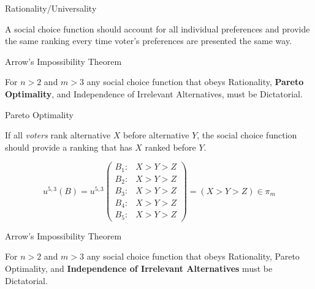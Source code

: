 \documentclass{beamer}
\begin{document}
\begin{frame}{Rationality/Universality}
    \begin{definition}[Rationality]
       A social choice function should account for all individual preferences and provide the same ranking every time voter's preferences are presented the same way. 
    \end{definition}
\end{frame}

\begin{frame}{Arrow's Impossibility Theorem}
    \begin{theorem}
    For $n > 2$ and $m > 3$ any social choice function that obeys Rationality, \textbf{Pareto Optimality}, and Independence of Irrelevant Alternatives, must be Dictatorial.
    \end{theorem}
\end{frame}

\begin{frame}{Pareto Optimality}
    \begin{definition}
        If all \emph{voters} rank alternative $X$ before alternative $Y$, the social choice function should provide a ranking that has $X$ ranked before $Y$.
    \end{definition}

    \large \begin{equation*}
  u^{5,3}(B) = u^{5,3}\left(
    \begin{array}{cc}
      B_1: & \text{$X > Y > Z$}\\
      B_2: & \text{$X > Y > Z$}\\
      B_3: & \text{$X > Y > Z$}\\
      B_4: & \text{$X > Y > Z$}\\ 
      B_5: & \text{$X > Y > Z$}
    \end{array} 
    \right) = (X > Y > Z) \in \pi_m
\end{equation*}
\end{frame}

\begin{frame}{Arrow's Impossibility Theorem}
    \begin{theorem}
    For $n > 2$ and $m > 3$ any social choice function that obeys Rationality, Pareto Optimality, and \textbf{Independence of Irrelevant Alternatives} must be Dictatorial.
    \end{theorem}
\end{frame}
\end{document}

